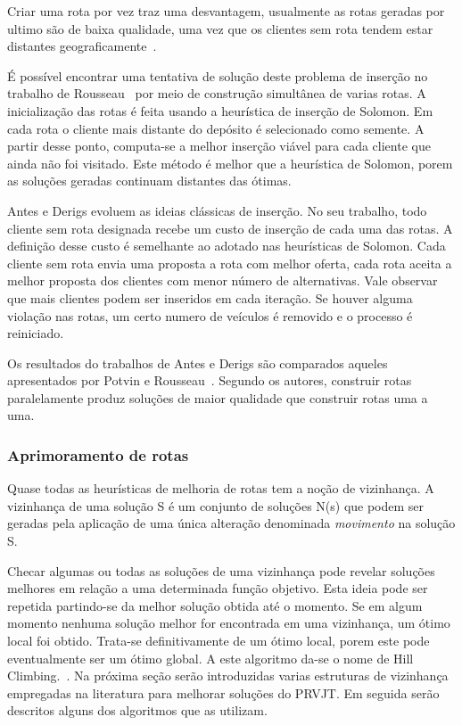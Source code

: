 Criar uma rota por vez traz uma desvantagem, usualmente as rotas geradas por ultimo são de baixa qualidade, uma vez que os clientes sem rota tendem estar distantes geograficamente~\cite{Sherbeny}. 

É possível encontrar uma tentativa de solução deste problema de inserção no trabalho de Rousseau~\cite{Rousseau} por meio de construção simultânea de varias rotas. A inicialização das rotas é feita usando a heurística de inserção de Solomon. Em cada rota o cliente mais distante do depósito é selecionado como semente.  A partir desse ponto, computa-se a melhor inserção viável para cada cliente que ainda não foi visitado. Este método é melhor que a heurística de Solomon, porem as soluções geradas continuam distantes das ótimas.

Antes e Derigs \cite{Derigs} evoluem as ideias clássicas de inserção. No seu trabalho, todo cliente sem rota designada recebe um custo de inserção de cada uma das rotas. A definição desse custo é semelhante ao adotado nas  heurísticas de Solomon.  Cada cliente sem rota envia uma proposta a rota com melhor oferta, cada rota aceita a melhor proposta dos clientes com menor número de alternativas.  Vale observar que mais clientes podem ser inseridos em cada iteração.  Se houver alguma violação nas rotas,  um certo numero de veículos é removido e o processo é reiniciado. 

Os resultados do trabalhos de Antes e Derigs \cite{Derigs} são comparados aqueles apresentados por Potvin e Rousseau~\cite{Rousseau}. Segundo os autores, construir rotas paralelamente produz soluções de maior qualidade que construir rotas uma a uma.


\subsubsection{Aprimoramento de rotas}

Quase todas as heurísticas de melhoria de rotas tem a noção de vizinhança. A vizinhança de uma solução S é um conjunto de soluções N(s) que podem ser geradas pela aplicação de uma única alteração denominada \textit{movimento} na solução S.

Checar algumas ou todas as soluções de uma vizinhança pode revelar soluções melhores em relação a uma determinada função objetivo. Esta ideia pode ser repetida partindo-se da melhor solução obtida até o momento. Se em algum momento nenhuma solução melhor for encontrada em uma vizinhança, um ótimo local foi obtido.  Trata-se definitivamente de um ótimo local, porem este pode eventualmente ser um ótimo global.  A este algoritmo da-se o nome de Hill Climbing.~\cite{Gendreau}.
Na próxima seção serão introduzidas varias estruturas de vizinhança empregadas na literatura para melhorar soluções do PRVJT. Em seguida serão descritos alguns dos algoritmos que as utilizam.

